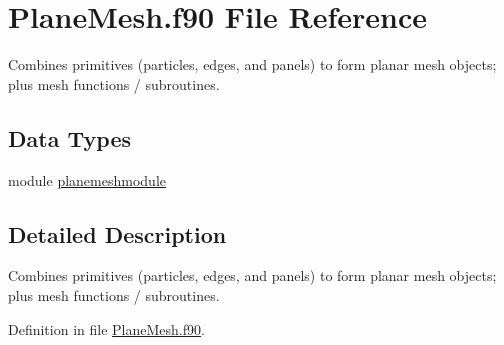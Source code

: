 \hypertarget{PlaneMesh_8f90}{\section{Plane\+Mesh.\+f90 File Reference}
\label{PlaneMesh_8f90}
}


Combines primitives (particles, edges, and panels) to form planar mesh objects; plus mesh functions / subroutines.  


\subsection*{Data Types}
\begin{DoxyCompactItemize}
\item 
module \hyperlink{classplanemeshmodule}{planemeshmodule}
\end{DoxyCompactItemize}


\subsection{Detailed Description}
Combines primitives (particles, edges, and panels) to form planar mesh objects; plus mesh functions / subroutines. 



Definition in file \hyperlink{PlaneMesh_8f90_source}{Plane\+Mesh.\+f90}.

